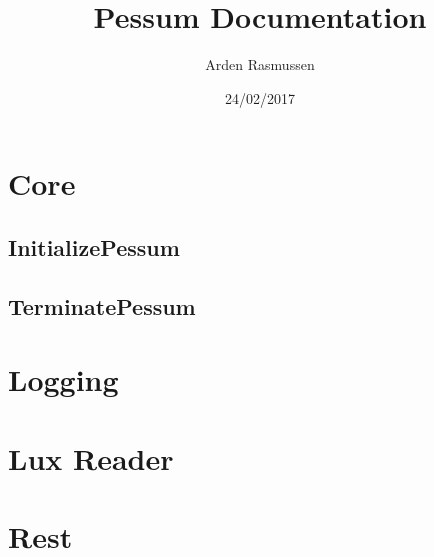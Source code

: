 \documentclass{article}
\title{Pessum Documentation}
\date{24/02/2017}
\author{Arden Rasmussen}
\begin{document}
\maketitle
\newpage
\tableofcontents
\newpage
{}
\section{Core}
\subsection{InitializePessum}
\subsection{TerminatePessum}
\newpage
\section{Logging}
\newpage
\section{Lux Reader}
\newpage
\section{Rest}
\newpage
\end{document}
